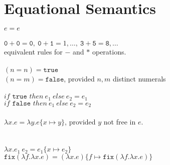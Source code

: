 \documentclass{westhesis}
\theoremstyle{plain}
\theoremstyle{definition}
\begin{document}
\section{Equational Semantics}
$e = e$ \\ \\
$\texttt{0} + \texttt{0} = \texttt{0}, \ \texttt{0} + \texttt{1} = 1, \ldots, \ \texttt{3} + \texttt{5} = \texttt{8}, \ldots$  \\
equivalent rules for $-$ and $*$ operations.
\\ \\
$(n =n) = \texttt{true}$ \\ $(n=m) = \texttt{false}$, provided $n, m$ distinct numerals \\ \\ 
$if \texttt{ true } then \ e_1 \ else \ e_2 = e_1$ \\
$if \texttt{ false } then \ e_1 \ else \ e_2 = e_2$ \\ \\ 
$\lambda x.e = \lambda y.e\{x \mapsto y \}$, provided $y$ not free in $e$. \\ \\ \\
$\lambda x.e_1 \ e_2 = e_1\{x \mapsto e_2\}$ \\
$\texttt{fix}(\lambda f. \lambda x.e) = (\lambda x.e)\{f \mapsto \texttt{fix}(\lambda f.\lambda x.e)\}$
\end{document}
